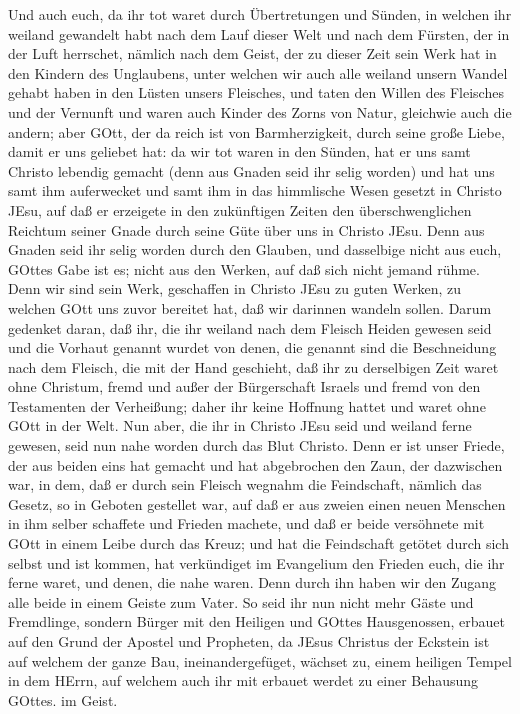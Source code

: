  Und auch euch, da ihr tot waret durch Übertretungen und
Sünden,  in welchen ihr weiland gewandelt habt nach dem Lauf
dieser Welt und nach dem Fürsten, der in der Luft herrschet, nämlich
nach dem Geist, der zu dieser Zeit sein Werk hat in den Kindern des
Unglaubens,  unter welchen wir auch alle weiland unsern
Wandel gehabt haben in den Lüsten unsers Fleisches, und taten den Willen
des Fleisches und der Vernunft und waren auch Kinder des Zorns von
Natur, gleichwie auch die andern;  aber GOtt, der da reich
ist von Barmherzigkeit, durch seine große Liebe, damit er uns geliebet
hat:  da wir tot waren in den Sünden, hat er uns samt
Christo lebendig gemacht (denn aus Gnaden seid ihr selig worden)
 und hat uns samt ihm auferwecket und samt ihm in das
himmlische Wesen gesetzt in Christo JEsu,  auf daß er
erzeigete in den zukünftigen Zeiten den überschwenglichen Reichtum
seiner Gnade durch seine Güte über uns in Christo JEsu. 
Denn aus Gnaden seid ihr selig worden durch den Glauben, und dasselbige
nicht aus euch, GOttes Gabe ist es;  nicht aus den Werken,
auf daß sich nicht jemand rühme.  Denn wir sind sein Werk,
geschaffen in Christo JEsu zu guten Werken, zu welchen GOtt uns zuvor
bereitet hat, daß wir darinnen wandeln sollen.  Darum
gedenket daran, daß ihr, die ihr weiland nach dem Fleisch Heiden gewesen
seid und die Vorhaut genannt wurdet von denen, die genannt sind die
Beschneidung nach dem Fleisch, die mit der Hand geschieht, 
daß ihr zu derselbigen Zeit waret ohne Christum, fremd und außer der
Bürgerschaft Israels und fremd von den Testamenten der Verheißung; daher
ihr keine Hoffnung hattet und waret ohne GOtt in der Welt. 
Nun aber, die ihr in Christo JEsu seid und weiland ferne gewesen, seid
nun nahe worden durch das Blut Christo.  Denn er ist unser
Friede, der aus beiden eins hat gemacht und hat abgebrochen den Zaun,
der dazwischen war, in dem, daß er durch sein Fleisch wegnahm die
Feindschaft,  nämlich das Gesetz, so in Geboten gestellet
war, auf daß er aus zweien einen neuen Menschen in ihm selber schaffete
und Frieden machete,  und daß er beide versöhnete mit GOtt
in einem Leibe durch das Kreuz; und hat die Feindschaft getötet durch
sich selbst  und ist kommen, hat verkündiget im Evangelium
den Frieden euch, die ihr ferne waret, und denen, die nahe waren.
 Denn durch ihn haben wir den Zugang alle beide in einem
Geiste zum Vater.  So seid ihr nun nicht mehr Gäste und
Fremdlinge, sondern Bürger mit den Heiligen und GOttes Hausgenossen,
 erbauet auf den Grund der Apostel und Propheten, da JEsus
Christus der Eckstein ist  auf welchem der ganze Bau,
ineinandergefüget, wächset zu, einem heiligen Tempel in dem HErrn,
 auf welchem auch ihr mit erbauet werdet zu einer Behausung
GOttes. im Geist.

